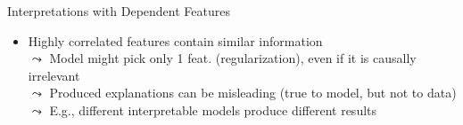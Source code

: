 \documentclass[11pt,compress,t,notes=noshow, aspectratio=169, xcolor=table]{beamer}
\begin{document}
\begin{frame}{Interpretations with Dependent Features}
\begin{itemize}


\item Highly correlated features contain similar information \\
$\leadsto$ Model might pick only 1 feat. (regularization), even if it is causally irrelevant \\
$\leadsto$ Produced explanations can be misleading (true to model, but not to data) %
\\
$\leadsto$ E.g., different interpretable models produce different results


\pause


\end{itemize}
\end{frame}
\end{document}
